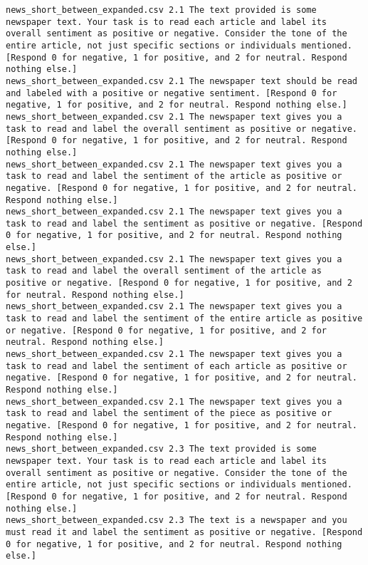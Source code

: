 \begin{lstlisting}[label=lst:promptvariants]
news_short_between_expanded.csv	2.1	The text provided is some newspaper text. Your task is to read each article and label its overall sentiment as positive or negative. Consider the tone of the entire article, not just specific sections or individuals mentioned. [Respond 0 for negative, 1 for positive, and 2 for neutral. Respond nothing else.]
news_short_between_expanded.csv	2.1	The newspaper text should be read and labeled with a positive or negative sentiment. [Respond 0 for negative, 1 for positive, and 2 for neutral. Respond nothing else.]
news_short_between_expanded.csv	2.1	The newspaper text gives you a task to read and label the overall sentiment as positive or negative. [Respond 0 for negative, 1 for positive, and 2 for neutral. Respond nothing else.]
news_short_between_expanded.csv	2.1	The newspaper text gives you a task to read and label the sentiment of the article as positive or negative. [Respond 0 for negative, 1 for positive, and 2 for neutral. Respond nothing else.]
news_short_between_expanded.csv	2.1	The newspaper text gives you a task to read and label the sentiment as positive or negative. [Respond 0 for negative, 1 for positive, and 2 for neutral. Respond nothing else.]
news_short_between_expanded.csv	2.1	The newspaper text gives you a task to read and label the overall sentiment of the article as positive or negative. [Respond 0 for negative, 1 for positive, and 2 for neutral. Respond nothing else.]
news_short_between_expanded.csv	2.1	The newspaper text gives you a task to read and label the sentiment of the entire article as positive or negative. [Respond 0 for negative, 1 for positive, and 2 for neutral. Respond nothing else.]
news_short_between_expanded.csv	2.1	The newspaper text gives you a task to read and label the sentiment of each article as positive or negative. [Respond 0 for negative, 1 for positive, and 2 for neutral. Respond nothing else.]
news_short_between_expanded.csv	2.1	The newspaper text gives you a task to read and label the sentiment of the piece as positive or negative. [Respond 0 for negative, 1 for positive, and 2 for neutral. Respond nothing else.]
news_short_between_expanded.csv	2.3	The text provided is some newspaper text. Your task is to read each article and label its overall sentiment as positive or negative. Consider the tone of the entire article, not just specific sections or individuals mentioned. [Respond 0 for negative, 1 for positive, and 2 for neutral. Respond nothing else.]
news_short_between_expanded.csv	2.3	The text is a newspaper and you must read it and label the sentiment as positive or negative. [Respond 0 for negative, 1 for positive, and 2 for neutral. Respond nothing else.]

\end{lstlisting}

